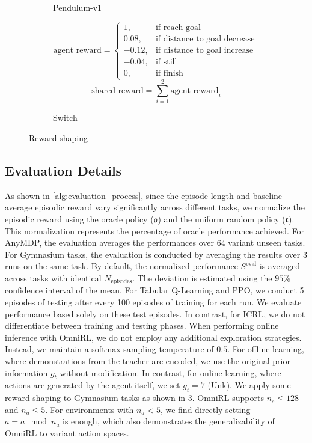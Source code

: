 \documentclass{article}
\begin{document}
\begin{figure}[h]
\begin{subfigure}{0.45\columnwidth}
        \caption{Pendulum-v1}
        \label{fig:reward_pendulum}
    \end{subfigure}
    \begin{subfigure}{0.45\columnwidth}
        \begin{equation}
            \text{agent reward} = \begin{cases}
                1, & \text{if reach goal} \\
                0.08, & \text{if distance to goal decrease} \\
                -0.12, & \text{if distance to goal increase } \\
                -0.04, & \text{if still } \\
                0, & \text{if finish}
            \end{cases} \nonumber
        \end{equation}
        \begin{equation}
            \text{shared reward} = \sum_{i=1}^{2} \text{agent reward}_i \nonumber
        \end{equation}
        \caption{Switch}
        \label{fig:reward_shaping_switch}
    \end{subfigure}
\caption{Reward shaping}
\label{fig:reward_shaping}
\end{figure}
\subsection{Evaluation Details} \label{sec:evaluation_detail}
As shown in \cref{alg:evaluation_process}, since the episode length and baseline average episodic reward vary significantly across different tasks, we normalize the episodic reward using the oracle policy ($\mathfrak{o}$) and the uniform random policy ($\mathfrak{r}$). This normalization represents the percentage of oracle performance achieved. For AnyMDP, the evaluation averages the performances over $64$ variant unseen tasks. For Gymnasium tasks, the evaluation is conducted by averaging the results over $3$ runs on the same task.
By default, the normalized performance $ S^{\text{eval}} $ is averaged across tasks with identical $ N_{\text{episodes}} $. The deviation is estimated using the $95\%$ confidence interval of the mean.
For Tabular Q-Learning and PPO, we conduct 5 episodes of testing after every 100 episodes of training for each run. We evaluate performance based solely on these test episodes. In contrast, for ICRL, we do not differentiate between training and testing phases.
When performing online inference with OmniRL, we do not employ any additional exploration strategies. Instead, we maintain a softmax sampling temperature of $0.5$. For offline learning, where demonstrations from the teacher are encoded, we use the original prior information $g_t$ without modification. In contrast, for online learning, where actions are generated by the agent itself, we set $g_t=7$ (Unk).
We apply some reward shaping to Gymnasium tasks as shown in \cref{fig:reward_shaping}. OmniRL supports $n_s \leq 128$ and $n_a \leq 5$. For environments with $n_a < 5$, we find directly setting $a=a \mod n_a$ is enough, which also demonstrates the generalizability of OmniRL to variant action spaces.
\end{document}
